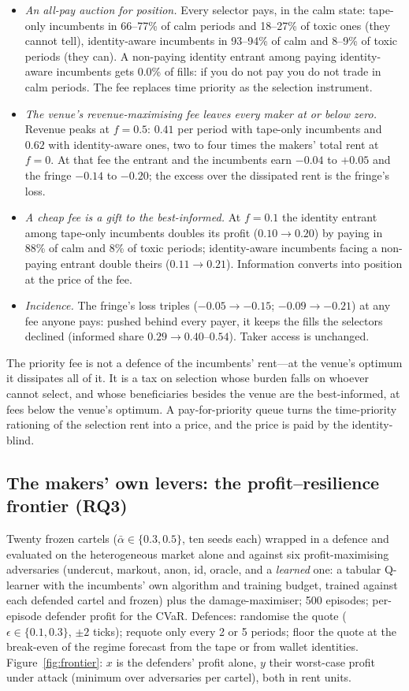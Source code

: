 \documentclass[11pt]{article}
\begin{document}
\begin{itemize}
\item \emph{An all-pay auction for position.} Every selector pays, in the calm state: tape-only incumbents in 66--77\% of calm periods and 18--27\% of toxic ones (they cannot tell), identity-aware incumbents in 93--94\% of calm and 8--9\% of toxic periods (they can). A non-paying identity entrant among paying identity-aware incumbents gets 0.0\% of fills: if you do not pay you do not trade in calm periods. The fee replaces time priority as the selection instrument.
\item \emph{The venue's revenue-maximising fee leaves every maker at or below zero.} Revenue peaks at $f=0.5$: $0.41$ per period with tape-only incumbents and $0.62$ with identity-aware ones, two to four times the makers' total rent at $f=0$. At that fee the entrant and the incumbents earn $-0.04$ to $+0.05$ and the fringe $-0.14$ to $-0.20$; the excess over the dissipated rent is the fringe's loss.
\item \emph{A cheap fee is a gift to the best-informed.} At $f=0.1$ the identity entrant among tape-only incumbents doubles its profit ($0.10\to0.20$) by paying in 88\% of calm and 8\% of toxic periods; identity-aware incumbents facing a non-paying entrant double theirs ($0.11\to0.21$). Information converts into position at the price of the fee.
\item \emph{Incidence.} The fringe's loss triples ($-0.05\to-0.15$; $-0.09\to-0.21$) at any fee anyone pays: pushed behind every payer, it keeps the fills the selectors declined (informed share $0.29\to0.40$--$0.54$). Taker access is unchanged.
\end{itemize}
The priority fee is not a defence of the incumbents' rent---at the venue's optimum it dissipates all of it. It is a tax on selection whose burden falls on whoever cannot select, and whose beneficiaries besides the venue are the best-informed, at fees below the venue's optimum. A pay-for-priority queue turns the time-priority rationing of the selection rent into a price, and the price is paid by the identity-blind.

\subsection{The makers' own levers: the profit--resilience frontier (RQ3)}\label{sec:defences}
Twenty frozen cartels ($\bar\alpha\in\{0.3,0.5\}$, ten seeds each) wrapped in a defence and evaluated on the heterogeneous market alone and against six profit-maximising adversaries (undercut, markout, anon, id, oracle, and a \emph{learned} one: a tabular Q-learner with the incumbents' own algorithm and training budget, trained against each defended cartel and frozen) plus the damage-maximiser; 500 episodes; per-episode defender profit for the CVaR. Defences: randomise the quote ($\epsilon\in\{0.1,0.3\}$, $\pm2$ ticks); requote only every 2 or 5 periods; floor the quote at the break-even of the regime forecast from the tape or from wallet identities. Figure~\ref{fig:frontier}: $x$ is the defenders' profit alone, $y$ their worst-case profit under attack (minimum over adversaries per cartel), both in rent units.
\end{document}
